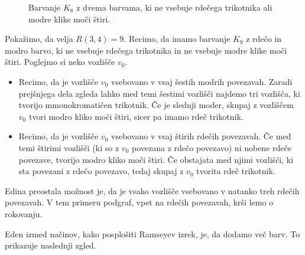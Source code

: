 \documentclass[twoside,11pt]{article}
\begin{document}
\begin{zgled}
\begin{figure}[h!]
        \caption{Barvanje $K_{8}$ z dvema barvama, ki ne vsebuje rdečega trikotnika ali 
        modre klike moči štiri.}
        \label{fig:r34}
    \end{figure}

    Pokažimo, da velja $R(3, 4) = 9$. Recimo, da imamo barvanje $K_9$ z rdečo in modro 
    barvo, ki ne vsebuje rdečega trikotnika in ne vsebuje modre klike moči štiri. Poglejmo 
    si neko vozlišče $v_0$. 
    \begin{itemize}
        \item Recimo, da je vozlišče $v_0$ vsebovano v vsaj šestih modrih povezavah. Zaradi 
        prejšnjega dela zgleda lahko med temi šestimi vozlišči najdemo tri vozlišča,
        ki tvorijo mmonokromatičen trikotnik. Če je slednji moder, skupaj z vozliščem $v_0$ tvori modro kliko moči 
        štiri, sicer pa imamo rdeč trikotnik.

        \item Recimo, da je vozlišče $v_0$ vsebovano v vsaj štirih rdečih povezavah. Če 
        med temi štirimi vozlišči (ki so z $v_0$ povezana z rdečo povezavo) ni nobene 
        rdeče povezave, tvorijo modro kliko moči štiri. Če obstajata med njimi vozlišči, 
        ki sta povezani z rdečo povezavo, tedaj skupaj z $v_0$ tvorita rdeč trikotnik.
    \end{itemize}
    
    Edina preostala možnost je, da je vsako vozlišče vsebovano v natanko treh rdečih povezavah. 
    V tem primeru podgraf, vpet na rdečih povezavah, krši lemo o rokovanju.
\end{zgled}

Eden izmed načinov, kako posplošiti Ramseyev izrek, je, da dodamo več barv. To prikazuje 
naslednji zgled. 
\end{document}
